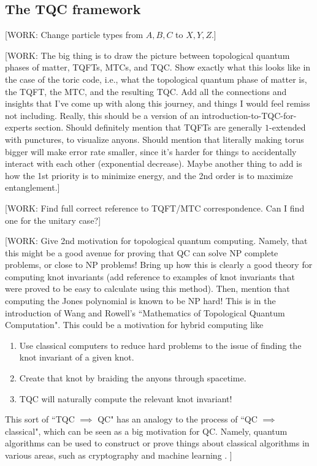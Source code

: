 \documentclass{article}
\theoremstyle{definition}
\numberwithin{figure}{section}
\begin{document}
\subsection{The TQC framework}
\label{The TQC framework}

[WORK: Change particle types from $A,B,C$ to $X,Y,Z$.]

[WORK: The big thing is to draw the picture between topological quantum phases of matter, TQFTs, MTCs, and TQC. Show exactly what this looks like in the case of the toric code, i.e., what the topological quantum phase of matter is, the TQFT, the MTC, and the resulting TQC. Add all the connections and insights that I've come up with along this journey, and things I would feel remiss not including. Really, this should be a version of an introduction-to-TQC-for-experts section. Should definitely mention that TQFTs are generally $1$-extended with punctures, to visualize anyons. Should mention that literally making torus bigger will make error rate smaller, since it's harder for things to accidentally interact with each other (exponential decrease). Maybe another thing to add is how the 1st priority is to minimize energy, and the 2nd order is to maximize entanglement.]


[WORK: Find full correct reference to TQFT/MTC correspondence. Can I find one for the unitary case?]

[WORK: Give 2nd motivation for topological quantum computing. Namely, that this might be a good avenue for proving that QC can solve NP complete problems, or close to NP problems! Bring up how this is clearly a good theory for computing knot invariants (add reference to examples of knot invariants that were proved to be easy to calculate using this method). Then, mention that computing the Jones polynomial is known to be NP hard! This is in the introduction of Wang and Rowell's ``Mathematics of Topological Quantum Computation". This could be a motivation for hybrid computing like

\begin{enumerate}
\item Use classical computers to reduce hard problems to the issue of finding the knot invariant of a given knot.
\item Create that knot by braiding the anyons through spacetime.
\item TQC will naturally compute the relevant knot invariant!
\end{enumerate}

This sort of ``TQC $\implies$ QC" has an analogy to the process of ``QC $\implies$ classical", which can be seen as a big motivation for QC. Namely, quantum algorithms can be used to construct or prove things about classical algorithms in various areas, such as cryptography \cite{regev2009lattices} and machine learning \cite{tang2019quantum}.
]
\end{document}
